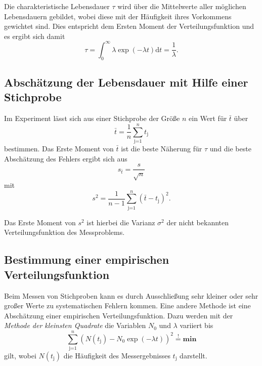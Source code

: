 Die charakteristische Lebensdauer $\tau$ wird über die Mittelwerte aller möglichen Lebensdauern gebildet, wobei diese mit der Häufigkeit ihres Vorkommens gewichtet sind.
Dies entspricht dem Ersten Moment der Verteilungsfunktion und es ergibt sich damit
\begin{equation*}
	\tau = \int_\text{0}^\infty \lambda \exp{(-\lambda t)} \text{d}t = \frac{1}{\lambda} .
\end{equation*}
\FloatBarrier
\subsection{Abschätzung der Lebensdauer mit Hilfe einer Stichprobe} %
\label{sub:abschaetzung_der_lebensdauer_mit_hilfe_einer_stichprobe}

Im Experiment lässt sich aus einer Stichprobe der Größe $n$ ein Wert für $\bar{t}$ über
\begin{equation*}
	\bar{t} = \frac{1}{n} \sum_{\text{j=1}}^n t_\text{j}
\end{equation*}
bestimmen.
Das Erste Moment von $\bar{t}$ ist die beste Näherung für $\tau$ und die beste Abschätzung des Fehlers ergibt sich aus
\begin{equation*}
	s_{\bar{t}} = \frac{s}{\sqrt{n}}
\end{equation*}
mit
\begin{equation*}
	s^2 = \frac{1}{n-1} \sum_\text{j=1}^n \left(\bar{t} - t_\text{j}\right)^2 .
\end{equation*}

Das Erste Moment von $s^2$ ist hierbei die Varianz $\sigma^2$ der nicht bekannten Verteilungsfunktion des Messproblems.
\FloatBarrier
\subsection{Bestimmung einer empirischen Verteilungsfunktion} %
\label{sub:bestimmung_einer_empirischen_verteilungsfunktion}


Beim Messen von Stichproben kann es durch Ausschließung sehr kleiner oder sehr großer Werte zu systematischen Fehlern kommen.
Eine andere Methode ist eine Abschätzung einer empirischen Verteilungsfunktion.
Dazu werden mit der \textit{Methode der kleinsten Quadrate} die Variablen $N_\text{0}$ und $\lambda$ variiert bis
\begin{equation*}
	\sum_\text{j=1}^n \left(N(t_\text{j})-N_\text{0}\exp{(-\lambda t)}\right)^2 \stackrel{!}{=} \textbf{min}
\end{equation*}
gilt, wobei $N(t_\text{j})$ die Häufigkeit des Messergebnisses $t_\text{j}$ darstellt.

